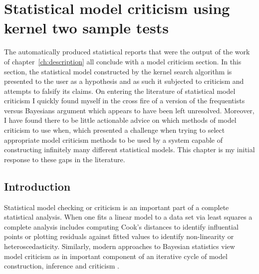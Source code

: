 
\inbpdocument

\chapter{Statistical model criticism using kernel two sample tests}
\label{ch:criticism}

The automatically produced statistical reports that were the output of the work of chapter~\ref{ch:description} all conclude with a model criticism section.
In this section, the statistical model constructed by the kernel search algorithm is presented to the user as a hypothesis and as such it subjected to criticism and attempts to falsify its claims.
On entering the literature of statistical model criticism I quickly found myself in the cross fire of a version of the frequentists versus Bayesians argument which appears to have been left unresolved.
Moreover, I have found there to be little actionable advice on which methods of model criticism to use when, which presented a challenge when trying to select appropriate model criticism methods to be used by a system capable of constructing infinitely many different statistical models.
%
This chapter is my initial response to these gaps in the literature.

\section{Introduction}

Statistical model checking or criticism\footnotemark{} is an important part of a complete statistical analysis.
When one fits a linear model to a data set via least squares a complete analysis includes computing \eg Cook's distances \citep{Cook1982-ia} to identify influential points or plotting residuals against fitted values to identify non-linearity or heteroscedasticity.
Similarly, modern approaches to Bayesian statistics view model criticism as in important component of an iterative cycle of model construction, inference and criticism \citep[e.g.][]{Gelman2013-st, Blei2014-uz}.

